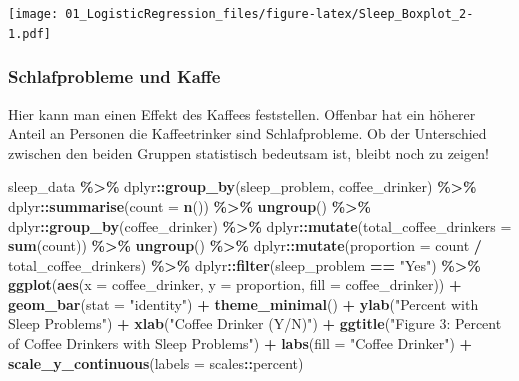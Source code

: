 \documentclass[
]{article}
\newenvironment{Shaded}{\begin{snugshade}}{\end{snugshade}}
\newcommand{\AttributeTok}[1]{\textcolor[rgb]{0.13,0.29,0.53}{#1}}
\newcommand{\FunctionTok}[1]{\textcolor[rgb]{0.13,0.29,0.53}{\textbf{#1}}}
\newcommand{\NormalTok}[1]{#1}
\newcommand{\SpecialCharTok}[1]{\textcolor[rgb]{0.81,0.36,0.00}{\textbf{#1}}}
\newcommand{\StringTok}[1]{\textcolor[rgb]{0.31,0.60,0.02}{#1}}
\begin{document}
\texttt{[image: 01\_LogisticRegression\_files/figure-latex/Sleep\_Boxplot\_2-1.pdf]}

\subsubsection{Schlafprobleme und Kaffe}\label{schlafprobleme-und-kaffe}

Hier kann man einen Effekt des Kaffees feststellen. Offenbar hat ein höherer Anteil an Personen die Kaffeetrinker sind Schlafprobleme. Ob der Unterschied zwischen den beiden Gruppen statistisch bedeutsam ist, bleibt noch zu zeigen!

\begin{Shaded}
\begin{Highlighting}[]
\NormalTok{  sleep\_data }\SpecialCharTok{\%\textgreater{}\%} 
\NormalTok{      dplyr}\SpecialCharTok{::}\FunctionTok{group\_by}\NormalTok{(sleep\_problem, coffee\_drinker) }\SpecialCharTok{\%\textgreater{}\%} 
\NormalTok{      dplyr}\SpecialCharTok{::}\FunctionTok{summarise}\NormalTok{(}\AttributeTok{count =} \FunctionTok{n}\NormalTok{()) }\SpecialCharTok{\%\textgreater{}\%} 
      \FunctionTok{ungroup}\NormalTok{() }\SpecialCharTok{\%\textgreater{}\%} 
\NormalTok{      dplyr}\SpecialCharTok{::}\FunctionTok{group\_by}\NormalTok{(coffee\_drinker) }\SpecialCharTok{\%\textgreater{}\%} 
\NormalTok{      dplyr}\SpecialCharTok{::}\FunctionTok{mutate}\NormalTok{(}\AttributeTok{total\_coffee\_drinkers =} \FunctionTok{sum}\NormalTok{(count)) }\SpecialCharTok{\%\textgreater{}\%} 
      \FunctionTok{ungroup}\NormalTok{() }\SpecialCharTok{\%\textgreater{}\%} 
\NormalTok{      dplyr}\SpecialCharTok{::}\FunctionTok{mutate}\NormalTok{(}\AttributeTok{proportion =}\NormalTok{ count }\SpecialCharTok{/}\NormalTok{ total\_coffee\_drinkers) }\SpecialCharTok{\%\textgreater{}\%} 
\NormalTok{      dplyr}\SpecialCharTok{::}\FunctionTok{filter}\NormalTok{(sleep\_problem }\SpecialCharTok{==} \StringTok{"Yes"}\NormalTok{) }\SpecialCharTok{\%\textgreater{}\%} 
      \FunctionTok{ggplot}\NormalTok{(}\FunctionTok{aes}\NormalTok{(}\AttributeTok{x =}\NormalTok{ coffee\_drinker, }\AttributeTok{y =}\NormalTok{ proportion, }\AttributeTok{fill =}\NormalTok{ coffee\_drinker)) }\SpecialCharTok{+} 
      \FunctionTok{geom\_bar}\NormalTok{(}\AttributeTok{stat =} \StringTok{"identity"}\NormalTok{) }\SpecialCharTok{+} 
      \FunctionTok{theme\_minimal}\NormalTok{() }\SpecialCharTok{+}
      \FunctionTok{ylab}\NormalTok{(}\StringTok{"Percent with Sleep Problems"}\NormalTok{) }\SpecialCharTok{+}
      \FunctionTok{xlab}\NormalTok{(}\StringTok{"Coffee Drinker (Y/N)"}\NormalTok{) }\SpecialCharTok{+}
      \FunctionTok{ggtitle}\NormalTok{(}\StringTok{"Figure 3: Percent of Coffee Drinkers with Sleep Problems"}\NormalTok{) }\SpecialCharTok{+}
      \FunctionTok{labs}\NormalTok{(}\AttributeTok{fill =} \StringTok{"Coffee Drinker"}\NormalTok{) }\SpecialCharTok{+} 
      \FunctionTok{scale\_y\_continuous}\NormalTok{(}\AttributeTok{labels =}\NormalTok{ scales}\SpecialCharTok{::}\NormalTok{percent)}
\end{Highlighting}
\end{Shaded}
\end{document}
